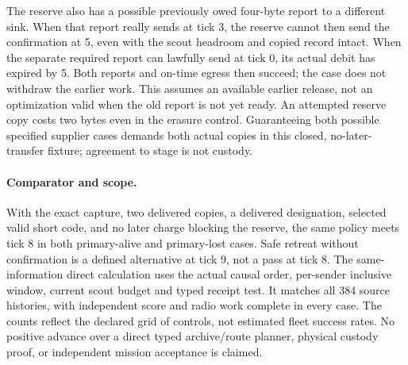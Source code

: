\documentclass[11pt]{article}
\begin{document}
The reserve also has a possible previously owed four-byte
report to a different sink. When that report really sends at
tick 3, the reserve cannot then send the confirmation at 5,
even with the scout headroom and copied record intact.
When the separate required report can lawfully send at tick
0, its actual debit has expired by 5. Both reports and on-time
egress then succeed; the case does not withdraw the earlier
work. This assumes an available earlier release, not an
optimization valid when the old report is not yet ready.
An attempted reserve copy costs two bytes even in the
erasure control. Guaranteeing both possible specified
supplier cases demands both actual copies in this closed,
no-later-transfer fixture; agreement to stage is not custody.

\paragraph{Comparator and scope.}
With the exact capture, two delivered copies, a delivered
designation, selected valid short code, and no later charge
blocking the reserve, the same policy meets tick 8 in both
primary-alive and primary-lost cases. Safe retreat without
confirmation is a defined alternative at tick 9, not a pass
at tick 8. The same-information direct calculation uses the
actual causal order, per-sender inclusive window, current
scout budget and typed receipt test. It matches all 384
source histories, with independent score and radio work
complete in every case. The counts reflect the declared grid
of controls, not estimated fleet success rates. No positive
advance over a direct typed archive/route planner, physical
custody proof, or independent mission acceptance is claimed.
\end{document}
